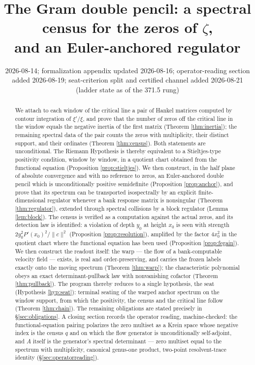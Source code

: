 \documentclass[11pt]{article}
\title{The Gram double pencil: a spectral census for the zeros of $\zeta$,\\
and an Euler-anchored regulator}
\author{}
\date{2026-08-14; formalization appendix updated 2026-08-16; operator-reading
section added 2026-08-19; seat-criterion split and certified channel added
2026-08-21 (ladder state as of the 371.5 rung)}
\theoremstyle{plain}
\theoremstyle{definition}
\theoremstyle{remark}
\begin{document}
\maketitle

\begin{abstract}
We attach to each window of the critical line a pair of Hankel matrices computed by
contour integration of $\xi'/\xi$, and prove that the number of zeros off the critical
line in the window equals the negative inertia of the first matrix (Theorem
\ref{thm:inertia}); the remaining spectral data of the pair counts the zeros with
multiplicity, their distinct support, and their ordinates (Theorem \ref{thm:census}).
Both statements are unconditional. The Riemann Hypothesis is thereby equivalent to a
Stieltjes-type positivity condition, window by window, in a quotient chart obtained
from the functional equation (Proposition \ref{prop:stieltjes}). We then construct,
in the half plane of absolute convergence and with no reference to zeros, an
Euler-anchored double pencil which is unconditionally positive semidefinite
(Proposition \ref{prop:anchor}), and prove that its spectrum can be transported
isospectrally by an explicit finite-dimensional regulator whenever a bank response
matrix is nonsingular (Theorem \ref{thm:regulator}), extended through spectral
collisions by a block regulator (Lemma \ref{lem:block}). The census is
verified as a computation against the actual zeros, and its detection law is
identified: a violation of depth $y_0$ at height $x_0$ is seen with strength
$2y_0^2P'(x_0)^2/\|c\|^2$ (Proposition \ref{prop:resolution}), amplified by
the factor $4x_0^2$ in the quotient chart where the functional equation has
been used (Proposition \ref{prop:fegain}). We then construct the readout
itself: the warp --- the flow of a bank-computable velocity field --- exists, is real
and order-preserving, and carries the frozen labels exactly onto the moving spectrum
(Theorem \ref{thm:warp}); the characteristic polynomial obeys an exact
determinant-pullback law with nonvanishing cofactor (Theorem \ref{thm:pullback}). The
program thereby reduces to a single hypothesis, the seat (Hypothesis \ref{hyp:seat}):
terminal seating of the warped anchor spectrum on the window support, from which the
positivity, the census and the critical line follow (Theorem \ref{thm:chain}). The
remaining obligations are stated precisely in \S\ref{sec:obligations}. A closing
section records the operator reading, machine-checked: the functional-equation
pairing polarizes the zero multiset as a Krein space whose negative index is the
census $q$ and on which the flow generator is unconditionally self-adjoint, and $A$
itself is the generator's spectral determinant --- zero multiset equal to the
spectrum with multiplicity, canonical genus-one product, two-point resolvent-trace
identity (\S\ref{sec:operatorreading}).
\end{abstract}
\end{document}
